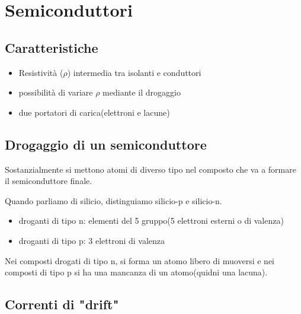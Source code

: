 \section{Semiconduttori}

\subsection{Caratteristiche}
\begin{itemize}
    \item Resistività ($\rho$) intermedia tra isolanti e conduttori
    \item possibilità di variare $\rho$ mediante il drogaggio
    \item due portatori di carica(elettroni e lacune)
\end{itemize}

\subsection{Drogaggio di un semiconduttore}
Sostanzialmente si mettono atomi di diverso tipo nel composto che va a formare il semiconduttore finale.

Quando parliamo di silicio, distinguiamo silicio-p e silicio-n.
\begin{itemize}
    \item droganti di tipo n: elementi del 5 gruppo(5 elettroni esterni o di valenza)
    \item droganti di tipo p: 3 elettroni di valenza 
\end{itemize}


Nei composti drogati di tipo n, si forma un atomo libero di muoversi e nei composti di tipo p si ha una mancanza di un atomo(quidni una lacuna).


\subsection{Correnti di "drift"}

